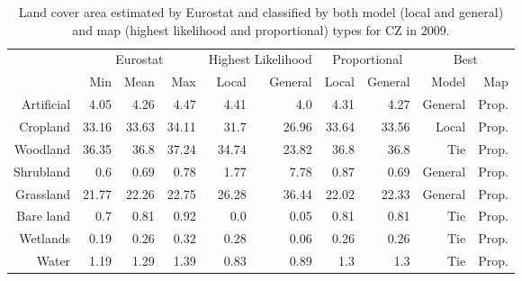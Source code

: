     \begin{table}[H]
    \centering
    \caption{Land cover area estimated by Eurostat and classified by both model (local and general) and map (highest likelihood and proportional) types for CZ in 2009.}
    
    \begin{tabular}{r|rrr|rr|rr|rr}
    \toprule
    {} & \multicolumn{3}{|c}{Eurostat} & \multicolumn{2}{|c}{Highest Likelihood} & \multicolumn{2}{|c}{Proportional} & \multicolumn{2}{|c}{Best} \\
    {} &      Min &   Mean &    Max &              Local & General &        Local & General &    Model &    Map \\
    \midrule
    Artificial &     4.05 &   4.26 &   4.47 &               4.41 &     4.0 &         4.31 &    4.27 &  General &  Prop. \\
    Cropland   &    33.16 &  33.63 &  34.11 &               31.7 &   26.96 &        33.64 &   33.56 &    Local &  Prop. \\
    Woodland   &    36.35 &   36.8 &  37.24 &              34.74 &   23.82 &         36.8 &    36.8 &      Tie &  Prop. \\
    Shrubland  &      0.6 &   0.69 &   0.78 &               1.77 &    7.78 &         0.87 &    0.69 &  General &  Prop. \\
    Grassland  &    21.77 &  22.26 &  22.75 &              26.28 &   36.44 &        22.02 &   22.33 &  General &  Prop. \\
    Bare land  &      0.7 &   0.81 &   0.92 &                0.0 &    0.05 &         0.81 &    0.81 &      Tie &  Prop. \\
    Wetlands   &     0.19 &   0.26 &   0.32 &               0.28 &    0.06 &         0.26 &    0.26 &      Tie &  Prop. \\
    Water      &     1.19 &   1.29 &   1.39 &               0.83 &    0.89 &          1.3 &     1.3 &      Tie &  Prop. \\
    \bottomrule
    \end{tabular}
    \end{table}
    

